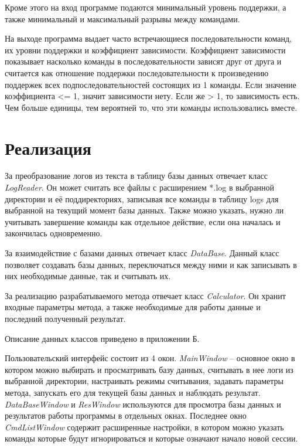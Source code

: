 Кроме этого на вход программе подаются минимальный уровень поддержки, а также минимальный и максимальный разрывы между командами.

На выходе программа выдает часто встречающиеся последовательности команд, их уровни поддержки и коэффициент зависимости.
Коэффициент зависимости показывает насколько команды в последовательности зависят друг от друга и считается как отношение поддержки последовательности к произведению поддержек всех подпоследовательностей состоящих из 1 команды. Если значение коэффициента <= 1, значит зависимости нету. Если же > 1, то зависимость есть. Чем больше единицы, тем вероятней то, что эти команды использовались вместе.

\section{Реализация}
За преобразование логов из текста в таблицу базы данных отвечает класс \textit{LogReader}.
Он может считать все файлы с расширением *.log в выбранной директории и её поддиректориях, записывая все команды в таблицу logs для выбранной на текущий момент базы данных. Также можно указать, нужно ли учитывать завершение команды как отдельное действие, если она началась и закончилась одновременно.

За взаимодействие с базами данных отвечает класс \textit{DataBase}.
Данный класс позволяет создавать базы данных,
переключаться между ними и как записывать в них необходимые данные, так и считывать их.

За реализацию разрабатываемого метода отвечает
класс \textit{Calculator}.
Он хранит входные параметры метода, а также необходимые для работы данные и последний полученный результат.

Описание данных классов приведено в приложении Б.


\newpage
Пользовательский интерфейс состоит из 4 окон. \textit{MainWindow} -- основное окно в котором можно выбирать и просматривать базу данных, считывать в нее логи из выбранной директории, настраивать режимы считывания, задавать параметры метода, запускать его для текущей базы данных и наблюдать результат. \textit{DataBaseWindow} и \textit{ResWindow} используются для просмотра базы данных и результатов работы программы в отдельных окнах. Последнее окно \textit{CmdListWindow} содержит расширенные настройки, в котором можно указать команды которые будут игнорироваться и которые означают начало новой сессии.

